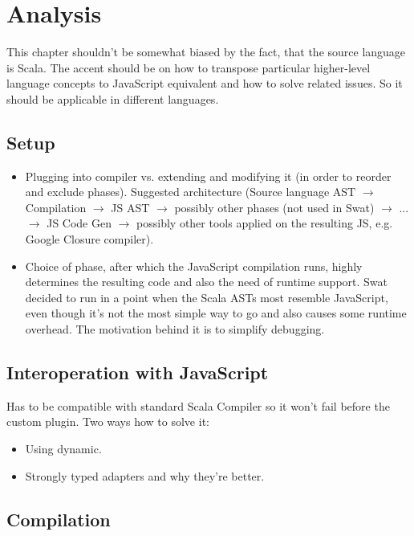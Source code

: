 \documentclass[12pt,a4paper]{report}
\begin{document}
\chapter{Analysis}

This chapter shouldn't be somewhat biased by the fact, that the source language is Scala. The accent should be on how to transpose particular higher-level language concepts to JavaScript equivalent and how to solve related issues. So it should be applicable in different languages.

\section{Setup}

\begin{itemize}
\item Plugging into compiler vs. extending and modifying it (in order to reorder and exclude phases). Suggested architecture (Source language AST $\rightarrow$ Compilation $\rightarrow$ JS AST $\rightarrow$ possibly other phases (not used in Swat) $\rightarrow$ ... $\rightarrow$ JS Code Gen $\rightarrow$ possibly other tools applied on the resulting JS, e.g. Google Closure compiler). 
\item Choice of phase, after which the JavaScript compilation runs, highly determines the resulting code and also the need of runtime support. Swat decided to run in a point when the Scala ASTs most resemble JavaScript, even though it's not the most simple way to go and also causes some runtime overhead. The motivation behind it is to simplify debugging.
\end{itemize}

\section{Interoperation with JavaScript}

Has to be compatible with standard Scala Compiler so it won't fail before the custom plugin. Two ways how to solve it: 
\begin{itemize}
\item Using dynamic.
\item Strongly typed adapters and why they're better.
\end{itemize}

\section{Compilation}
\end{document}
